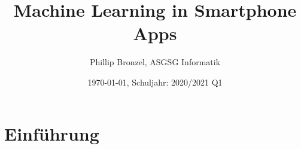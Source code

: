 \documentclass[12pt]{article}
\title{Machine Learning in Smartphone Apps}
\date{\today, Schuljahr: 2020/2021 Q1}
\author{Phillip Bronzel, ASGSG Informatik}
\begin{document}
  \maketitle
  \newpage
  \tableofcontents
  \newpage
  \section{Einführung}
  
\end{document}
